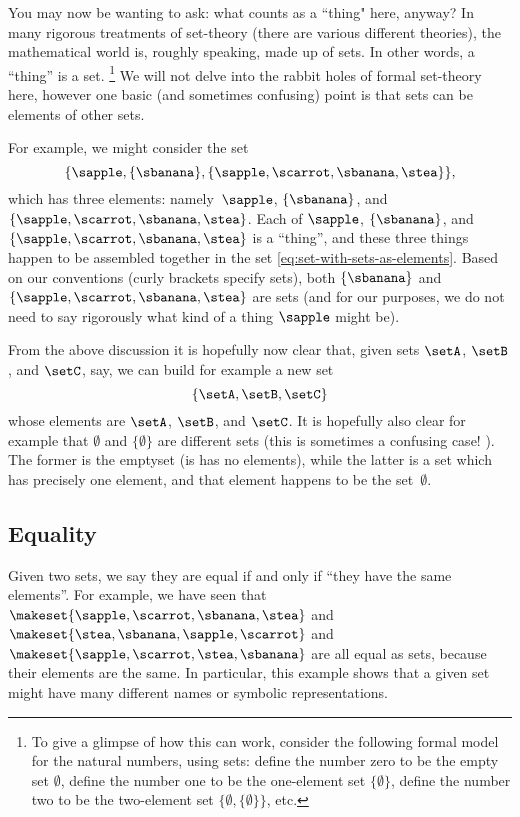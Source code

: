 You may now be wanting to ask: what counts as a ``thing" here, anyway?
In many rigorous treatments of set-theory (there are various different theories), the mathematical world is, roughly speaking, made up of sets.
In other words, a ``thing'' is a set.
\footnote{To give a glimpse of how this can work, consider the following formal model for the natural numbers, using sets: define the number zero to be the empty set $\emptyset$, define the number one to be the one-element set $\{ \emptyset \}$, define the number two to be the two-element set $\{ \emptyset, \{ \emptyset \} \}$, etc. }
We will not delve into the rabbit holes of formal set-theory here, however one basic (and sometimes confusing) point is that sets can be elements of other sets.

For example, we might consider the set
%
\begin{equation}\label{eq:set-with-sets-as-elements}
    \{ \sapple, \{ \sbanana \}, \{ \sapple, \scarrot, \sbanana, \stea \} \},
\end{equation}
%
which has three elements: namely~$\sapple$, $\{ \sbanana \}$, and~$\{ \sapple, \scarrot, \sbanana, \stea \}$.
Each of $\sapple$, $\{ \sbanana \}$, and~$\{ \sapple, \scarrot, \sbanana, \stea \}$ is a ``thing'', and these three things happen to be assembled together in the set \cref{eq:set-with-sets-as-elements}.
Based on our conventions (curly brackets specify sets), both $\{ \sbanana \}$ and~$\{ \sapple, \scarrot, \sbanana, \stea \}$ are sets (and for our purposes, we do not need to say rigorously what kind of a thing $\sapple$ might be).

From the above discussion it is hopefully now clear that, given sets $\setA$, $\setB$, and $\setC$, say, we can build for example a new set
\begin{equation}
    \{ \setA, \setB, \setC \}
\end{equation}
whose elements are $\setA$, $\setB$, and $\setC$.
It is hopefully also clear for example that $\emptyset$ and $\{ \emptyset \}$ are different sets (this is sometimes a confusing case!
).
The former is the emptyset (is has no elements), while the latter is a set which has precisely one element, and that element happens to be the set~$\emptyset$.

\subsection{Equality}

Given two sets, we say they are equal if and only if ``they have the same elements''.
For example, we have seen that $\makeset{ \sapple, \scarrot, \sbanana, \stea }$ and~$\makeset{ \stea, \sbanana, \sapple, \scarrot}$ and~$\makeset{ \sapple, \scarrot, \stea, \sbanana }$ are all equal as sets, because their elements are the same.
In particular, this example shows that a given set might have many different names or symbolic representations.

